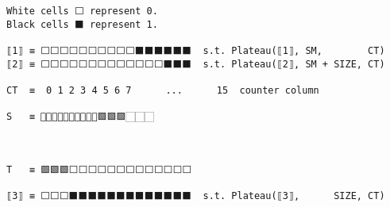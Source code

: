 \documentclass[varwidth=\maxdimen,margin=0.5cm,multi={verbatim}]{standalone}
\begin{document}
\begin{verbatim}
White cells ⬜ represent 0.
Black cells ⬛ represent 1.

⟦1⟧ ≡ ⬜⬜⬜⬜⬜⬜⬜⬜⬜⬜⬛⬛⬛⬛⬛⬛  s.t. Plateau(⟦1⟧, SM,        CT)
⟦2⟧ ≡ ⬜⬜⬜⬜⬜⬜⬜⬜⬜⬜⬜⬜⬜⬛⬛⬛  s.t. Plateau(⟦2⟧, SM + SIZE, CT)
      
CT  ≡  0 1 2 3 4 5 6 7      ...      15  counter column

S   ≡ 🏻🏻🏻🏻🏻🏻🏻🏻🏻🏻🟩🟩🟩🏻🏻🏻
                                    
                                    
                                    
T   ≡ 🟩🟩🟩⬜⬜⬜⬜⬜⬜⬜⬜⬜⬜⬜⬜⬜

⟦3⟧ ≡ ⬜⬜⬜⬛⬛⬛⬛⬛⬛⬛⬛⬛⬛⬛⬛⬛  s.t. Plateau(⟦3⟧,      SIZE, CT)
\end{verbatim}
\end{document}
